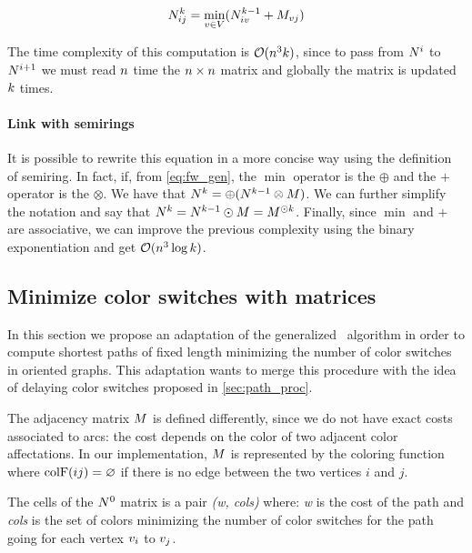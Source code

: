 \begin{equation}
  \label{eq:fw_gen}
  N^k_{ij} = \min_{v \in V} (N^{k-1}_{iv} + M_{v j})
\end{equation}

The time complexity of this computation is $\mathcal{O}(n^3 k)$, since to pass from $N^i$ to $N^{i+1}$ we must read $n$ time the $n \times n$ matrix and globally the matrix is updated $k$ times.

\paragraph{Link with semirings} It is possible to rewrite this equation in a more concise way using the definition of semiring. In fact, if, from \cref{eq:fw_gen}, the $\min$ operator is the $\oplus$ and the $+$ operator is the $\otimes$. We have that $N^k = \oplus (N^{k-1} \otimes M)$. We can further simplify the notation and say that $N^k = N^{k-1} \odot M = M^{\odot k}$. Finally, since $\min$ and $+$ are associative, we can improve the previous complexity using the binary exponentiation \cite{binexp} and get $\mathcal{O}(n^3 \log k)$.


\subsection{Minimize color switches with matrices}
\label{sec:algo_matrix}

In this section we propose an adaptation of the generalized \FW\ algorithm in order to compute shortest paths of fixed length minimizing the number of color switches in oriented graphs. This adaptation wants to merge this procedure with the idea of delaying color switches proposed in \cref{sec:path_proc}.

The adjacency matrix $M$ is defined differently, since we do not have exact costs associated to arcs: the cost depends on the color of two adjacent color affectations. In our implementation, $M$ is represented by the coloring function where $\text{colF}(ij) = \varnothing$ if there is no edge between the two vertices $i$ and $j$.

The cells of the $N^0$ matrix is a pair \textit{(w, cols)} where: \textit{w} is the cost of the path and \textit{cols} is the set of colors minimizing the number of color switches for the path going for each vertex $v_i$ to $v_j$.

